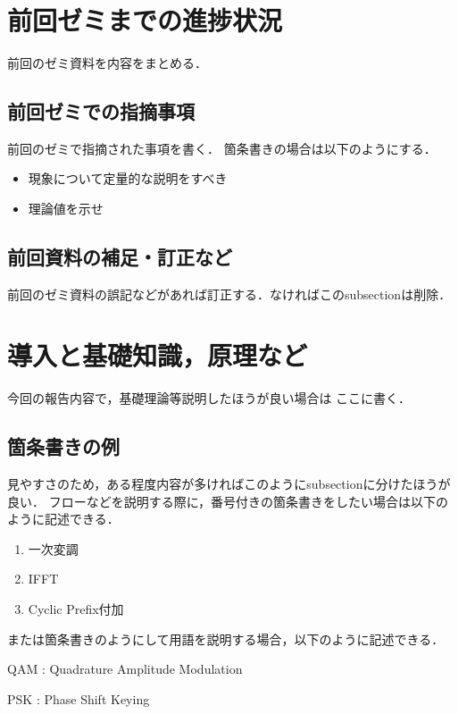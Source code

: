 \documentclass[fleqn, a4paper, twocolumn]{jsarticle}
\title{}
\date{}
\author{}
\numberwithin{figure}{section}
\numberwithin{table}{section}
\numberwithin{equation}{section}
\begin{document}
\noindent{\textgt{\Large \thetitle}}\\  %
\noindent \theauthor \hfill             %
\thedate                                %

\section{前回ゼミまでの進捗状況}
前回のゼミ資料を内容をまとめる．

\subsection{前回ゼミでの指摘事項}
前回のゼミで指摘された事項を書く．
箇条書きの場合は以下のようにする．
\begin{itemize}
	\item 現象について定量的な説明をすべき
	\item 理論値を示せ
\end{itemize}

\subsection{前回資料の補足・訂正など}
前回のゼミ資料の誤記などがあれば訂正する．なければこのsubsectionは削除．

\section{導入と基礎知識，原理など}
今回の報告内容で，基礎理論等説明したほうが良い場合は
ここに書く．

\subsection{箇条書きの例}
見やすさのため，ある程度内容が多ければこのようにsubsectionに分けたほうが良い．
フローなどを説明する際に，番号付きの箇条書きをしたい場合は以下のように記述できる．
\begin{enumerate}
	\item 一次変調
	\item IFFT
	\item Cyclic Prefix付加
\end{enumerate}
または箇条書きのようにして用語を説明する場合，以下のように記述できる．
\begin{discription}
	\item [QAM]: Quadrature Amplitude Modulation
	\item [PSK]: Phase Shift Keying
\end{discription}
\end{document}
